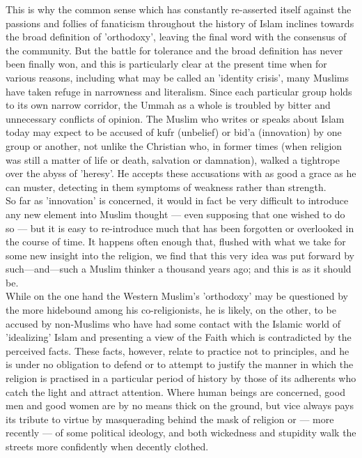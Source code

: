 \documentclass[11pt, b5paper, twoside]{book}
\begin{document}
This is why the common sense which has constantly re-asserted itself against the passions and follies of fanaticism throughout the history of Islam inclines towards the broad definition of 'orthodoxy', leaving the final word with the consensus of the community. But the battle for tolerance and the broad definition has never been finally won, and this is particularly clear at the present time when for various reasons, including what may be called an 'identity crisis', many Muslims have taken refuge in narrowness and literalism. Since each particular group holds to its own narrow corridor, the Ummah as a whole is troubled by bitter and unnecessary conflicts of opinion. The Muslim who writes or speaks about Islam today may expect to be accused of kufr (unbelief) or bid'a (innovation) by one group or another, not unlike the Christian who, in former times (when religion was still a matter of life or death, salvation or damnation), walked a tightrope over the abyss of 'heresy'. He accepts these accusations with as good a grace as he can muster, detecting in them symptoms of weakness rather than strength. \\

So far as 'innovation' is concerned, it would in fact be very difficult to introduce any new element into Muslim thought --- even supposing that one wished to do so --- but it is easy to re-introduce much that has been forgotten or overlooked in the course of time. It happens often enough that, flushed with what we take for some new insight into the religion, we find that this very idea was put forward by such---and---such a Muslim thinker a thousand years ago; and this is as it should be. \\

While on the one hand the Western Muslim's 'orthodoxy' may be questioned by the more hidebound among his co-religionists, he is likely, on the other, to be accused by non-Muslims who have had some contact with the Islamic world of 'idealizing' Islam and presenting a view of the Faith which is contradicted by the perceived facts. These facts, however, relate to practice not to principles, and he is under no obligation to defend or to attempt to justify the manner in which the religion is practised in a particular period of history by those of its adherents who catch the light and attract attention. Where human beings are concerned, good men and good women are by no means thick on the ground, but vice always pays its tribute to virtue by masquerading behind the mask of religion or --- more recently --- of some political ideology, and both wickedness and stupidity walk the streets more confidently when decently clothed. \\
\end{document}
